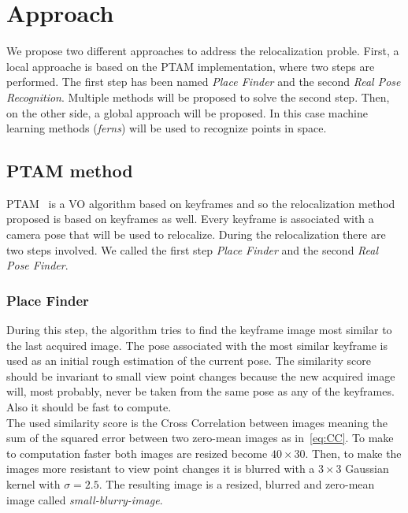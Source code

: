 \chapter{Approach}\label{sec:approach}

We propose two different approaches to address the relocalization proble. First, a local approache is based on the PTAM implementation, where two steps are performed. The first step has been named \textit{Place Finder} and the second \textit{Real Pose Recognition}. Multiple methods will be proposed to solve the second step. Then, on the other side, a global approach will be proposed. In this case machine learning methods (\textit{ferns}) will be used to recognize points in space.

\section{PTAM method}
\label{sec:ptam_method}

PTAM~\cite{KleinMurray2007} is a VO algorithm based on keyframes and so the relocalization method proposed is based on keyframes as well. Every keyframe is associated with a camera pose that will be used to relocalize. During the relocalization there are two steps involved. We called the first step \textit{Place Finder} and the second \textit{Real Pose Finder}.

\subsection{Place Finder}
\label{ssub:place_recognition}

During this step, the algorithm tries to find the keyframe image most similar to the last acquired image. The pose associated with the most similar keyframe is used as an initial rough estimation of the current pose. The similarity score should be invariant to small view point changes because the new acquired image will, most probably, never be taken from the same pose as any of the keyframes. Also it should be fast to compute.\\

The used similarity score is the Cross Correlation between images meaning the sum of the squared error between two zero-mean images as in~\ref{eq:CC}. To make to computation faster both images are resized become $40\times30$. Then, to make the images more resistant to view point changes it is blurred with a $3\times3$ Gaussian kernel with $\sigma=2.5$. The resulting image is a resized, blurred and zero-mean image called \textit{small-blurry-image}.\\

